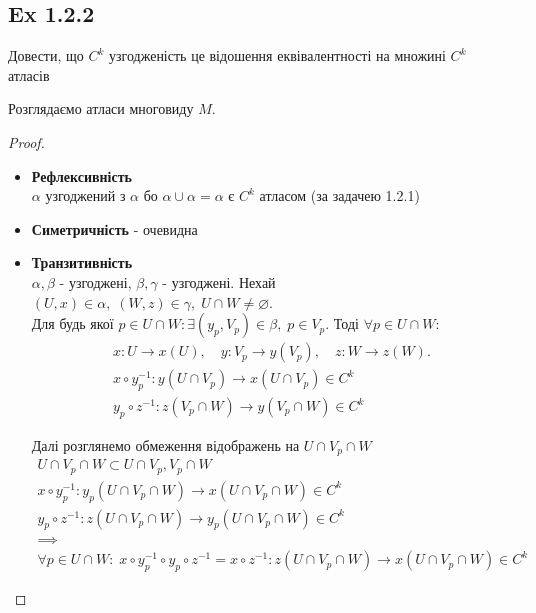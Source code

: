 \documentclass[10pt, a4paper]{article} %
\begin{document}
\subsection*{Ex 1.2.2}
\begin{mdframed}
    Довести, що $C^k$ узгодженість це відошення еквівалентності на множині $C^k$ атласів
\end{mdframed}
Розглядаємо атласи многовиду $M$.
\begin{proof}
    \begin{itemize}
        \item \textbf{Рефлексивність}\\
        $\alpha$ узгоджений з $\alpha$ бо $\alpha\cup\alpha=\alpha$ є $C^k$ атласом (за задачею 1.2.1)
        \item \textbf{Симетричність} - очевидна
        \item \textbf{Транзитивність}\\
        $\alpha,\beta$ - узгоджені, $\beta,\gamma$ - узгоджені.
        Нехай $(U,x)\in\alpha, \; (W,z)\in\gamma, \; U\cap W \ne \varnothing$. \\
        

        Для будь якої $p \in U\cap W: \exists (y_p, V_p) \in \beta, \; p\in V_p$.
        Тоді $\forall p \in U\cap W:$
        \begin{gather*}
            x : U \to x(U), \quad y : V_p \to y(V_p), \quad z : W \to z(W).\\
            x \circ y_p^{-1} : y(U\cap V_p) \to x(U\cap V_p) \in C^k\\
            y_p \circ z^{-1} : z(V_p\cap W) \to y(V_p\cap W) \in C^k
        \end{gather*}

        Далі розглянемо обмеження відображень на $U\cap V_p \cap W$
        \begin{gather*}
            U\cap V_p\cap W \subset U\cap V_p, V_p\cap W\\
            x \circ y_p^{-1} : y_p(U\cap V_p\cap W) \to x(U\cap V_p\cap W) \in C^k\\
            y_p \circ z^{-1} : z(U\cap V_p\cap W) \to y_p(U\cap V_p\cap W) \in C^k\\
            \implies\\
            \forall p\in U\cap W:\; x \circ y_p^{-1} \circ y_p \circ z^{-1} = x \circ z^{-1} : z(U\cap V_p\cap W) \to x(U\cap V_p\cap W) \in C^k
        \end{gather*}


\end{itemize}
\end{proof}
\end{document}

